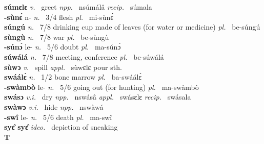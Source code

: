 {\bfseries súmɛlɛ}  {\itshape v.~} greet   {\itshape npp.~} nsúmálâ {\itshape recip.~} súmala  \\ 
{\bfseries -sùnɛ́} n- {\itshape n.~} 3/4 flesh {\itshape pl.~} mi-sùnɛ́    \\ 
{\bfseries súngú}  {\itshape n.~} 7/8 drinking cup made of leaves (for water or medicine) {\itshape pl.~} be-súngú    \\ 
{\bfseries sùngù}  {\itshape n.~} 7/8 war  {\itshape pl.~} be-sùngù    \\ 
{\bfseries -súnɔ́} le- {\itshape n.~} 5/6 doubt {\itshape pl.~} ma-súnɔ́   \\ 
{\bfseries súwálá}  {\itshape n.~} 7/8 meeting, conference {\itshape pl.~} be-súwálá    \\ 
{\bfseries sùwɔ}  {\itshape v.~} spill   {\itshape appl.~} sùwɛlɛ pour sth.  \\ 
{\bfseries swáálɛ̀}  {\itshape n.~} 1/2 bone marrow {\itshape pl.~} ba-swáálɛ̀    \\ 
{\bfseries -swàmbò} le- {\itshape n.~} 5/6 going out (for hunting) {\itshape pl.~} ma-swàmbò    \\ 
{\bfseries swásɔ}  {\itshape v.i.~} dry {\itshape npp.~} nswásâ {\itshape appl.~} swásɛlɛ {\itshape recip.~} swásala  \\ 
{\bfseries swàwɔ}  {\itshape v.i.~} hide  {\itshape npp.~} nswàwá  \\ 
{\bfseries -swî} le- {\itshape n.~} 5/6 death {\itshape pl.~} ma-swî    \\ 
{\bfseries syɛ̂ syɛ̂}  {\itshape ideo.~} depiction of sneaking    \\ 

\medskip
\noindent \large {\bfseries T}\normalsize\\
\medskip


